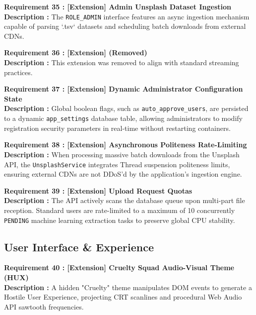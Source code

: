 \documentclass[12pt, a4paper]{article}
\begin{document}
\noindent\textbf{Requirement 35 : [Extension] Admin Unsplash Dataset Ingestion}\\
\textbf{Description :} The \texttt{ROLE\_ADMIN} interface features an async ingestion mechanism capable of parsing `.tsv` datasets and scheduling batch downloads from external CDNs.
\vspace{1em}

\noindent\textbf{Requirement 36 : [Extension] (Removed)}\\
\textbf{Description :} This extension was removed to align with standard streaming practices.
\vspace{1em}

\noindent\textbf{Requirement 37 : [Extension] Dynamic Administrator Configuration State}\\
\textbf{Description :} Global boolean flags, such as \texttt{auto\_approve\_users}, are persisted to a dynamic \texttt{app\_settings} database table, allowing administrators to modify registration security parameters in real-time without restarting containers.
\vspace{1em}

\noindent\textbf{Requirement 38 : [Extension] Asynchronous Politeness Rate-Limiting}\\
\textbf{Description :} When processing massive batch downloads from the Unsplash API, the \texttt{UnsplashService} integrates Thread suspension politeness limits, ensuring external CDNs are not DDoS'd by the application's ingestion engine.
\vspace{1em}

\noindent\textbf{Requirement 39 : [Extension] Upload Request Quotas}\\
\textbf{Description :} The API actively scans the database queue upon multi-part file reception. Standard users are rate-limited to a maximum of 10 concurrently \texttt{PENDING} machine learning extraction tasks to preserve global CPU stability.

\subsection*{User Interface \& Experience}

\noindent\textbf{Requirement 40 : [Extension] Cruelty Squad Audio-Visual Theme (HUX)}\\
\textbf{Description :} A hidden "Cruelty" theme manipulates DOM events to generate a Hostile User Experience, projecting CRT scanlines and procedural Web Audio API sawtooth frequencies.
\end{document}
